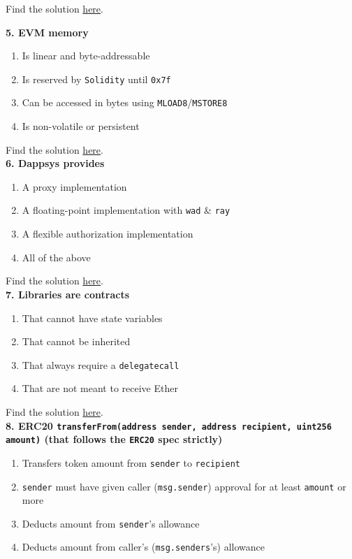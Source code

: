 Find the solution \hyperref[sec:exam3_q4]{here}.\\

\pagebreak

\textbf{5. EVM memory}

\begin{enumerate}[label=\Alph*.]
    \item Is linear and byte-addressable
    \item Is reserved by \verb|Solidity| until \verb|0x7f|
    \item Can be accessed in bytes using \verb|MLOAD8|/\verb|MSTORE8|
    \item Is non-volatile or persistent
\end{enumerate}

Find the solution \hyperref[sec:exam3_q5]{here}.\\

\textbf{6. Dappsys provides}

\begin{enumerate}[label=\Alph*.]
    \item A proxy implementation
    \item A floating-point implementation with \verb|wad| \& \verb|ray|
    \item A flexible authorization implementation
    \item All of the above
\end{enumerate}

Find the solution \hyperref[sec:exam3_q6]{here}.\\

\textbf{7. Libraries are contracts}

\begin{enumerate}[label=\Alph*.]
    \item That cannot have state variables
    \item That cannot be inherited
    \item That always require a \verb|delegatecall|
    \item That are not meant to receive Ether
\end{enumerate}

Find the solution \hyperref[sec:exam3_q7]{here}.\\

\textbf{8.  ERC20 \texttt{transferFrom(address sender, address recipient, uint256 amount)} (that follows the \texttt{ERC20} spec strictly)}

\begin{enumerate}[label=\Alph*.]
    \item Transfers token amount from \verb|sender| to \verb|recipient|
    \item \verb|sender| must have given caller (\verb|msg.sender|) approval for at least \verb|amount| or more
    \item Deducts amount from \verb|sender|'s allowance
    \item Deducts amount from caller's (\verb|msg.senders|'s) allowance
\end{enumerate}

